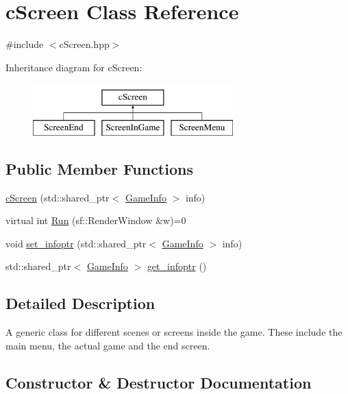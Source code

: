 \hypertarget{classcScreen}{}\section{c\+Screen Class Reference}
\label{classcScreen}


{\ttfamily \#include $<$c\+Screen.\+hpp$>$}

Inheritance diagram for c\+Screen\+:\begin{figure}[H]
\begin{center}
\leavevmode
\includegraphics[height=2.000000cm]{classcScreen}
\end{center}
\end{figure}
\subsection*{Public Member Functions}
\begin{DoxyCompactItemize}
\item 
\hyperlink{classcScreen_abb06ae98ccb31bc0fd2174547a10ca0d}{c\+Screen} (std\+::shared\+\_\+ptr$<$ \hyperlink{classGameInfo}{Game\+Info} $>$ info)
\item 
virtual int \hyperlink{classcScreen_a4b4057ffec7ab1492a4de19f9994cac4}{Run} (sf\+::\+Render\+Window \&w)=0
\item 
void \hyperlink{classcScreen_aa741f84e247decd04cb714bc1c33f93d}{set\+\_\+infoptr} (std\+::shared\+\_\+ptr$<$ \hyperlink{classGameInfo}{Game\+Info} $>$ info)
\item 
std\+::shared\+\_\+ptr$<$ \hyperlink{classGameInfo}{Game\+Info} $>$ \hyperlink{classcScreen_a7fea97aa92e8d84dafd9119e9b2545d4}{get\+\_\+infoptr} ()
\end{DoxyCompactItemize}


\subsection{Detailed Description}
A generic class for different scenes or screens inside the game. These include the main menu, the actual game and the end screen. 

\subsection{Constructor \& Destructor Documentation}
\hypertarget{classcScreen_abb06ae98ccb31bc0fd2174547a10ca0d}{}\label{classcScreen_abb06ae98ccb31bc0fd2174547a10ca0d} 

